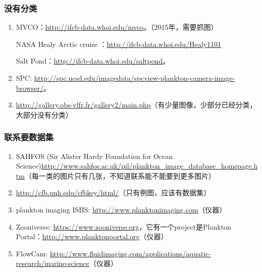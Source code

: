 \subsubsection{没有分类}
\begin{enumerate}
\item MVCO：\url{http://ifcb-data.whoi.edu/mvco}。（2015年，需要抓图）

NASA Healy Arctic cruise ：\url{http://ifcb-data.whoi.edu/Healy1101}

Salt Pond：\url{http://ifcb-data.whoi.edu/saltpond}。

\item SPC: \url{http://spc.ucsd.edu/imagedata/spcview-plankton-camera-image-browser/}。

\item \url{http://gallery.obs-vlfr.fr/gallery2/main.php}（有少量图像，少部分已经分类，大部分没有分类）
\end{enumerate}

\subsubsection{联系要数据集}
\begin{enumerate}
\item SAHFOS (Sir Alister Hardy Foundation for Ocean Science)\url{http://www.sahfos.ac.uk/pil/plankton_image_database_homepage.htm}（每一类的图片只有几张，不知道联系能不能要到更多图片）

\item \url{http://cfb.unh.edu/cfbkey/html/}（只有例图，应该有数据集）

\item plankton imaging ISIIS: \url{http://www.planktonimaging.com}（仪器）

\item Zooniverse: \url{https://www.zooniverse.org}，它有一个project是Plankton Portal：\url{http://www.planktonportal.org}（仪器）

\item FlowCam: \url{http://www.fluidimaging.com/applications/aquatic-research/marine-science}（仪器）

\end{enumerate}

